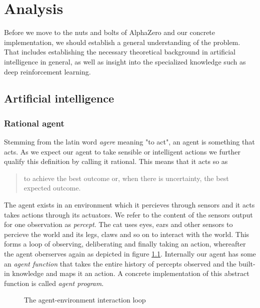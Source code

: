 \chapter{Analysis}
Before we move to the nuts and bolts of AlphaZero and our concrete implementation, we should establish a general understanding of the problem. That includes establishing the necessary theoretical background in artificial intelligence in general, as well as insight into the specialized knowledge such as deep reinforcement learning.

\section{Artificial intelligence}

\subsection{Rational agent}
Stemming from the latin word \textit{agere} meaning "to act", an agent is something that acts. As we expect our agent to take sensible or intelligent actions we further qualify this definition by calling it rational. This means that it acts so as
\begin{quote}
    to achieve the best outcome or, when there is uncertainty, the best expected outcome.
\end{quote} \cite[p. 36]{russell_artificial_2021}

The agent exists in an environment which it percieves through sensors and it acts takes actions through its actuators. We refer to the content of  the sensors output for one observation as \textit{percept}. The cat uses eyes, ears and other sensors to percieve the world and its legs, claws and so on to interact with the world. This forms a loop of observing, deliberating and finally taking an action, whereafter the agent oberserves again as depicted in figure \ref{agent-environment-loop}. Internally our agent has some an \textit{agent function} that takes the entire history of percepts observed and the built-in knowledge and maps it an action. A concrete implementation of this abstract function is called \textit{agent program}.

\begin{figure}
    \centering
    
    \caption{The agent-environment interaction loop}
    \label{agent-environment-loop}
\end{figure}

